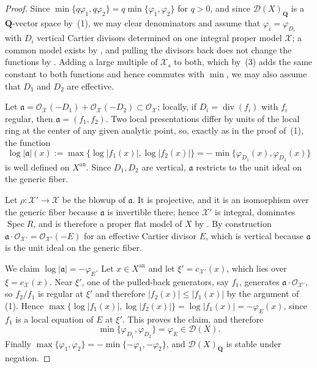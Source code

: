 \begin{proof}
Since $\min\{q\varphi_1,q\varphi_2\}=q\min\{\varphi_1,\varphi_2\}$ for
$q>0$, and since $\mathcal D(X)_{\mathbf Q}$ is a $\mathbf Q$-vector
space by \,(1), we may clear
denominators and assume that $\varphi_i=\varphi_{D_i}$ with $D_i$
vertical Cartier divisors determined on one integral proper model
$\mathcal X$; a common model exists by , and
pulling the divisors back does not change the functions by
. Adding a large multiple of
$\mathcal X_s$ to both, which by
\,(3) adds the same constant to
both functions and hence commutes with $\min$, we may also assume that
$D_1$ and $D_2$ are effective.

Let $\mathfrak a=\mathcal O_{\mathcal X}(-D_1)+\mathcal O_{\mathcal X}(-D_2)
\subset\mathcal O_{\mathcal X}$; locally, if $D_i=\operatorname{div}(f_i)$
with $f_i$ regular, then $\mathfrak a=(f_1,f_2)$. Two local
presentations differ by units of the local ring at the center of any given
analytic point, so, exactly as in the proof of
\,(1), the function
\[
 \log|\mathfrak a|(x):=\max\bigl\{\log|f_1(x)|,\log|f_2(x)|\bigr\}
 =-\min\{\varphi_{D_1}(x),\varphi_{D_2}(x)\}
\]
is well defined on $X^{\mathrm{an}}$. Since $D_1,D_2$ are vertical,
$\mathfrak a$ restricts to the unit ideal on the generic fiber.

Let $\rho:\mathcal X'\to\mathcal X$ be the blowup of $\mathfrak a$.
It is projective, and it is an isomorphism over the generic fiber because
$\mathfrak a$ is invertible there; hence $\mathcal X'$ is integral,
dominates $\operatorname{Spec}R$, and is therefore a proper flat model of
$X$ by . By construction
$\mathfrak a\cdot\mathcal O_{\mathcal X'}=\mathcal O_{\mathcal X'}(-E)$ for
an effective Cartier divisor $E$, which is vertical because
$\mathfrak a$ is the unit ideal on the generic fiber.

We claim $\log|\mathfrak a|=-\varphi_E$. Let $x\in X^{\mathrm{an}}$ and
let $\xi'=c_{\mathcal X'}(x)$, which lies over $\xi=c_{\mathcal X}(x)$.
Near $\xi'$, one of the pulled-back generators, say $f_1$, generates
$\mathfrak a\cdot\mathcal O_{\mathcal X'}$, so $f_2/f_1$ is regular at
$\xi'$ and therefore $|f_2(x)|\le|f_1(x)|$ by the argument of
\,(1). Hence
$\max\{\log|f_1(x)|,\log|f_2(x)|\}=\log|f_1(x)|=-\varphi_E(x)$, since
$f_1$ is a local equation of $E$ at $\xi'$. This proves the claim, and
therefore
\[
 \min\{\varphi_{D_1},\varphi_{D_2}\}=\varphi_E
 \in\mathcal D(X).
\]
Finally $\max\{\varphi_1,\varphi_2\}
=-\min\{-\varphi_1,-\varphi_2\}$, and
$\mathcal D(X)_{\mathbf Q}$ is stable under negation.
\end{proof}

